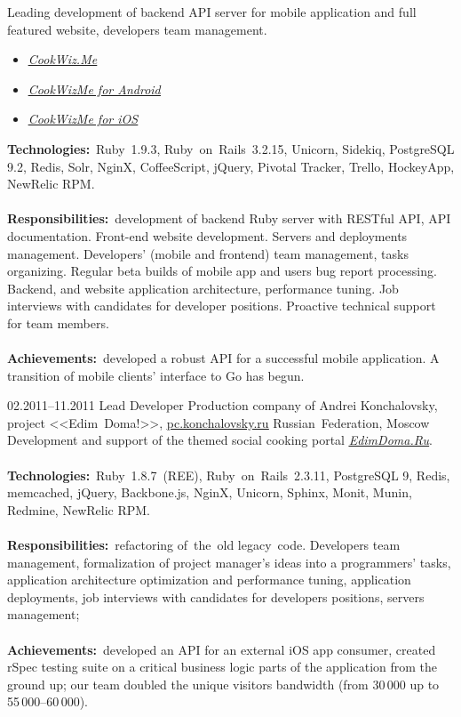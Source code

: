 \documentclass[12pt,a4paper,final]{moderncv}
\begin{document}
{
  Leading development of backend API server for mobile application and full featured website, developers team management.
  \bigskip
  \begin{itemize}
    \item \underline{\href{https://cookwiz.me/}{\itshape CookWiz.Me}}
    \item \underline{\href{https://play.google.com/store/apps/details?id=com.cookwizme}{\itshape CookWizMe for Android}}
    \item \underline{\href{https://itunes.apple.com/app/id605764643}{\itshape CookWizMe for iOS}}
  \end{itemize}
  \bigskip
  \textbf{Technologies:}~Ruby~1.9.3, Ruby~on~Rails~3.2.15, Unicorn, Sidekiq, PostgreSQL 9.2, Redis, Solr, NginX, CoffeeScript, jQuery, Pivotal Tracker, Trello, HockeyApp, NewRelic RPM.
  \\\\
  \textbf{Responsibilities:}~development of backend Ruby server with RESTful API, API documentation. Front-end website development. Servers and deployments management. Developers' (mobile and frontend) team management, tasks organizing. Regular beta builds of mobile app and users bug report processing. Backend, and website application architecture, performance tuning. Job interviews with candidates for developer positions. Proactive technical support for team members.
  \\\\
  \textbf{Achievements:}~developed a robust API for a successful mobile application. A transition of mobile clients' interface to Go has begun.
}
%
\cventry
{02.2011--11.2011}
{Lead Developer}
{
  Production company of Andrei Konchalovsky, project <<Edim~Doma!>>, \underline{\href{http://pc.konchalovsky.ru}{pc.konchalovsky.ru}}
}
{Russian~Federation, Moscow}
{}
{
  Development and support of the themed social cooking portal \underline{\href{http://www.edimdoma.ru}{\itshape EdimDoma.Ru}}.
  \\\\
  \textbf{Technologies:}~Ruby~1.8.7~(REE), Ruby~on~Rails~2.3.11, PostgreSQL 9, Redis, memcached, jQuery, Backbone.js, NginX, Unicorn, Sphinx, Monit, Munin, Redmine, NewRelic RPM.
  \\\\
  \textbf{Responsibilities:}~refactoring of~the~old legacy~code. Developers team management, formalization of project manager's ideas into a programmers' tasks, application architecture optimization and performance tuning, application deployments, job interviews with candidates for developers positions, servers management;
  \\\\
  \textbf{Achievements:}~developed an API for an external iOS app consumer, created rSpec testing suite on a critical business logic parts of the application from the ground up; our team doubled the unique visitors bandwidth (from 30\,000 up to 55\,000--60\,000).
}
\end{document}
